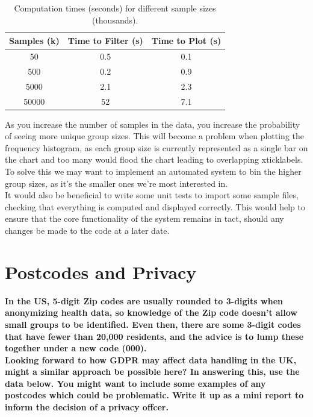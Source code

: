 \documentclass{article}
\begin{document}
\begin{table}[H]
    \centering
    \caption{Computation times (seconds) for different sample sizes (thousands).}
    \label{tbl:times}
    \begin{tabular}{@{}ccc@{}}
    \toprule
    Samples (k) & Time to Filter (s) & Time to Plot (s) \\ \midrule
    50          & 0.5                & 0.1              \\
    500         & 0.2                & 0.9              \\
    5000        & 2.1                & 2.3              \\
    50000       & 52                 & 7.1              \\ \bottomrule
    \end{tabular}
\end{table}

As you increase the number of samples in the data, you increase the probability of seeing more unique group sizes.
This will become a problem when plotting the frequency histogram, as each group size is currently represented as a single bar on the chart and too many would flood the chart leading to overlapping xticklabels. 
To solve this we may want to implement an automated system to bin the higher group sizes, as it's the smaller ones we're most interested in. \\ 


It would also be beneficial to write some unit tests to import some sample files, checking that everything is computed and displayed correctly. This would help to ensure that the core functionality of the system remains in tact, should any changes be made to the code at a later date.

\section{Postcodes and Privacy}

\textbf{In the US, 5-digit Zip codes are usually rounded to 3-digits when anonymizing health data, so knowledge of the Zip code doesn't allow small groups to be identified. Even then, there are some 3-digit codes that have fewer than 20,000 residents, and the advice is to lump these together under a new code (000).} \\ 

\textbf{Looking forward to how GDPR may affect data handling in the UK, might a similar approach be possible here? In answering this, use the data below. You might want to include some examples of any postcodes which could be problematic. Write it up as a mini report to inform the decision of a privacy offcer.} \\ 
\end{document}
